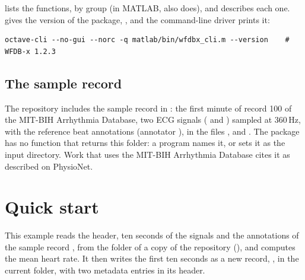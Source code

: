  lists the functions, by group (in MATLAB, 
also does), and  describes each one.  gives
the version of the package, , and the command-line driver prints it:

\begin{lstlisting}[style=shell]
octave-cli --no-gui --norc -q matlab/bin/wfdbx_cli.m --version    # WFDB-x 1.2.3
\end{lstlisting}

\subsection{The sample record}
\label{sec:matlab-resources}

The repository includes the sample record  in : the first
minute of record 100 of the MIT-BIH Arrhythmia Database, two ECG signals ( and
) sampled at 360\,Hz, with the reference beat annotations (annotator
), in the files ,  and . The
package has no function that returns this folder: a program names it, or sets it as the
input directory. Work that uses the MIT-BIH Arrhythmia Database cites it as described on
PhysioNet.

\section{Quick start}
\label{sec:matlab-quickstart}

This example reads the header, ten seconds of the signals and the annotations of the
sample record , from the folder  of a copy of the repository
(), and computes the mean heart rate. It then writes the first ten
seconds as a new record, , in the current folder, with two metadata entries
in its header.

